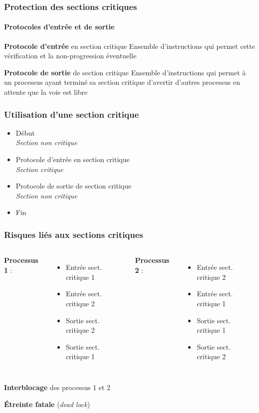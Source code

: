 \begin{frame}
\frametitle{Protection des sections critiques}
\framesubtitle{Protocoles d’entrée et de sortie}
\begin{block}{\textbf{Protocole d'entrée} en section critique}
Ensemble d'instructions qui permet cette vérification et la non-progression éventuelle
\end{block}
\begin{block}{\textbf{Protocole de sortie} de section critique}
Ensemble d'instructions qui permet à un processus ayant terminé sa section critique d'avertir d'autres processus en attente que la voie est libre
\end{block}
\end{frame}

\begin{frame}
\frametitle{Utilisation d’une section critique}
\begin{itemize}
\item Début \\ \textit{Section non critique}
\item Protocole d'entrée en section critique \\ \textit{Section critique}
\item Protocole de sortie de section critique \\ \textit{Section non critique}
\item Fin
\end{itemize}
\end{frame}

\begin{frame}
\frametitle{Risques liés aux sections critiques}
\begin{columns}
\textbf{Processus 1} :
\begin{itemize}
\item Entrée sect. critique 1
\item Entrée sect. critique 2


\item Sortie sect. critique 2
\item Sortie sect. critique 1
\end{itemize}
\textbf{Processus 2} :
\begin{itemize}
\item Entrée sect. critique 2
\item Entrée sect. critique 1


\item Sortie sect. critique 1
\item Sortie sect. critique 2
\end{itemize}
\end{columns}
\begin{block}{}
\begin{center}
\textbf{Interblocage} des processus 1 et 2

\textbf{Étreinte fatale }(\textit{dead lock})
\end{center}
\end{block}
\end{frame}

